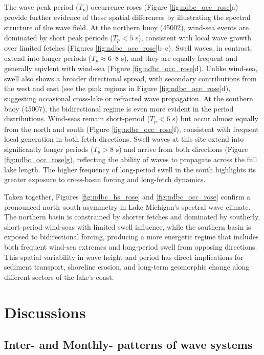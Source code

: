 The wave peak period ($T_p$) occurrence roses (Figure \ref{fig:ndbc_occ_rose}a)
provide further evidence of these spatial differences by illustrating the
spectral structure of the wave field. At the northern buoy (45002), wind-sea
events are dominated by short peak periods ($T_p < 5$ s), consistent with local
wave growth over limited fetches (Figures \ref{fig:ndbc_occ_rose}b–c). Swell
waves, in contrast, extend into longer periods ($T_p \approx 6$–8 s), and they
are equally frequent and generally eqivlent with wind-sea (Figure
\ref{fig:ndbc_occ_rose}d). Unlike wind-sea, swell also shows a broader
directional spread, with secondary contributions from the west and east (see the
pink regions in Figure \ref{fig:ndbc_occ_rose}d), suggesting occasional
cross-lake or refracted wave propagation. At the southern buoy (45007), the
bidirectional regime is even more evident in the period distributions. Wind-seas
remain short-period ($T_p < 6$ s) but occur almost equally from the north and
south (Figure \ref{fig:ndbc_occ_rose}f), consistent with frequent local
generation in both fetch directions. Swell waves at this site extend into
significantly longer periods ($T_p > 8$ s) and arrive from both directions
(Figure \ref{fig:ndbc_occ_rose}g), reflecting the ability of waves to propagate
across the full lake length. The higher frequency of long-period swell in the
south highlights its greater exposure to cross-basin forcing and long-fetch
dynamics.

Taken together, Figures \ref{fig:ndbc_hs_rose} and \ref{fig:ndbc_occ_rose}
confirm a pronounced north–south asymmetry in Lake Michigan’s spectral wave
climate. The northern basin is constrained by shorter fetches and dominated by
southerly, short-period wind-seas with limited swell influence, while the
southern basin is exposed to bidirectional forcing, producing a more energetic
regime that includes both frequent wind-sea extremes and long-period swell from
opposing directions. This spatial variability in wave height and period has
direct implications for sediment transport, shoreline erosion, and long-term
geomorphic change along different sectors of the lake’s coast.

\section{Discussions}
\label{c4_Discussions}


\subsection{Inter- and Monthly- patterns of wave systems}
\label{Inter- and Monthly- patterns of wave systems}

